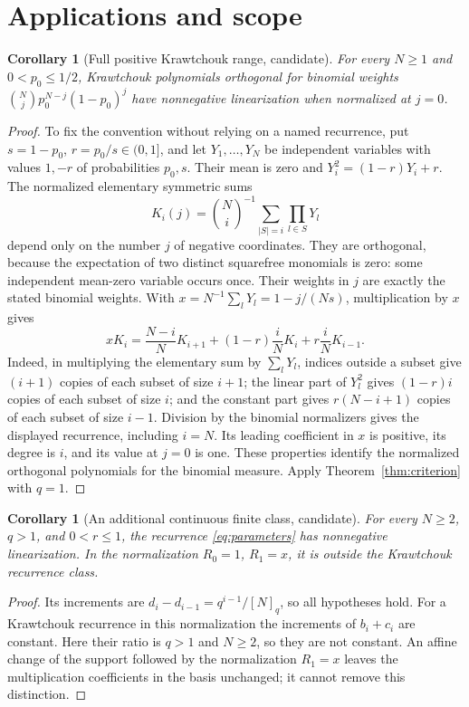 \documentclass[11pt]{article}
\newtheorem{corollary}[theorem]{Corollary}
\begin{document}
\section{Applications and scope}
\begin{corollary}[Full positive Krawtchouk range, candidate]\label{cor:kraw}
For every $N\geq1$ and $0<p_0\leq1/2$, Krawtchouk polynomials orthogonal for binomial weights $\binom Nj p_0^{N-j}(1-p_0)^j$ have nonnegative linearization when normalized at $j=0$.
\end{corollary}
\begin{proof}
To fix the convention without relying on a named recurrence, put $s=1-p_0$, $r=p_0/s\in(0,1]$, and let $Y_1,\ldots,Y_N$ be independent variables with values $1,-r$ of probabilities $p_0,s$. Their mean is zero and $Y_i^2=(1-r)Y_i+r$. The normalized elementary symmetric sums
\[
K_i(j)=\binom Ni^{-1}\sum_{|S|=i}\prod_{l\in S}Y_l
\]
depend only on the number $j$ of negative coordinates. They are orthogonal, because the expectation of two distinct squarefree monomials is zero: some independent mean-zero variable occurs once. Their weights in $j$ are exactly the stated binomial weights. With $x=N^{-1}\sum_lY_l=1-j/(Ns)$, multiplication by $x$ gives
\[
xK_i=\frac{N-i}{N}K_{i+1}+(1-r)\frac iN K_i+r\frac iN K_{i-1}.
\]
Indeed, in multiplying the elementary sum by $\sum_lY_l$, indices outside a subset give $(i+1)$ copies of each subset of size $i+1$; the linear part of $Y_l^2$ gives $(1-r)i$ copies of each subset of size $i$; and the constant part gives $r(N-i+1)$ copies of each subset of size $i-1$. Division by the binomial normalizers gives the displayed recurrence, including $i=N$. Its leading coefficient in $x$ is positive, its degree is $i$, and its value at $j=0$ is one. These properties identify the normalized orthogonal polynomials for the binomial measure. Apply Theorem~\ref{thm:criterion} with $q=1$.
\end{proof}

\begin{corollary}[An additional continuous finite class, candidate]\label{cor:additional}
For every $N\geq2$, $q>1$, and $0<r\leq1$, the recurrence \eqref{eq:parameters} has nonnegative linearization. In the normalization $R_0=1$, $R_1=x$, it is outside the Krawtchouk recurrence class.
\end{corollary}
\begin{proof}
Its increments are $d_i-d_{i-1}=q^{i-1}/[N]_q$, so all hypotheses hold. For a Krawtchouk recurrence in this normalization the increments of $b_i+c_i$ are constant. Here their ratio is $q>1$ and $N\geq2$, so they are not constant. An affine change of the support followed by the normalization $R_1=x$ leaves the multiplication coefficients in the basis unchanged; it cannot remove this distinction.
\end{proof}
\end{document}
